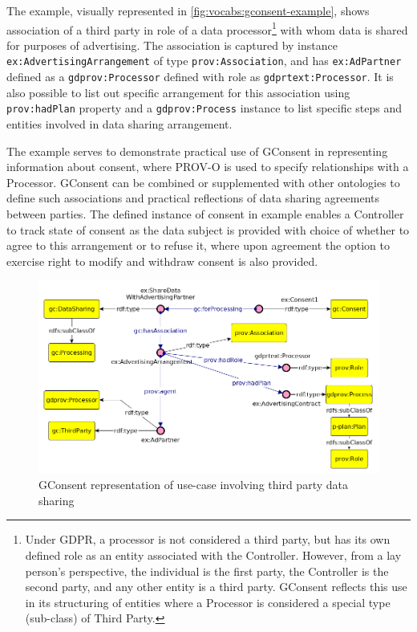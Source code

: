 The example, visually represented in \autoref{fig:vocabs:gconsent-example}, shows association of a third party in role of a data processor\footnote{Under GDPR, a processor is not considered a third party, but has its own defined role as an entity associated with the Controller. However, from a lay person's perspective, the individual is the first party, the Controller is the second party, and any other entity is a third party. GConsent reflects this use in its structuring of entities where a Processor is considered a special type (sub-class) of Third Party.}
with whom data is shared for purposes of advertising. The association is captured by instance \texttt{ex:AdvertisingArrangement} of type \texttt{prov:Association}, and has \texttt{ex:AdPartner} defined as a \texttt{gdprov:Processor} defined with role as \texttt{gdprtext:Processor}. It is also possible to list out specific arrangement for this association using \texttt{prov:hadPlan} property and a \texttt{gdprov:Process} instance to list specific steps and entities involved in data sharing arrangement.

The example serves to demonstrate practical use of GConsent in representing information about consent, where PROV-O is used to specify relationships with a Processor. GConsent can be combined or supplemented with other ontologies to define such associations and practical reflections of data sharing agreements between parties. The defined instance of consent in example enables a Controller to track state of consent as the data subject is provided with choice of whether to agree to this arrangement or to refuse it, where upon agreement the option to exercise right to modify and withdraw consent is also provided.
\begin{figure}[htbp]
    \centering
    \includegraphics[width=0.8\linewidth]{img/gconsent_third_party_datasharing.png}
    \caption{GConsent representation of use-case involving third party data sharing \cite{pandit_gconsent_2019}}
    \label{fig:vocabs:gconsent-example}
\end{figure}

